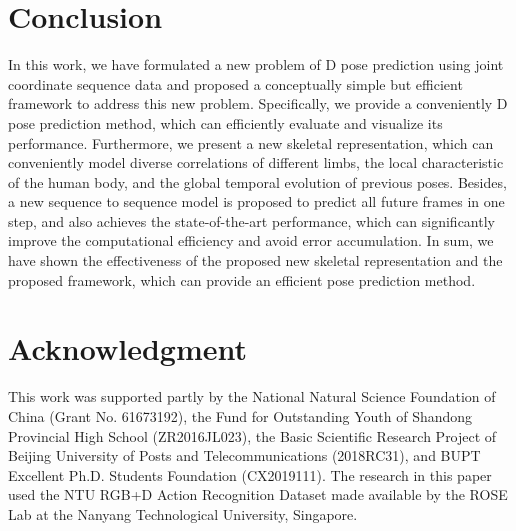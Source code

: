 \documentclass[journal]{IEEEtran}
\begin{document}
\section{Conclusion}
In this work, we have formulated a new problem of D pose prediction using joint coordinate sequence data and proposed a conceptually simple but efficient framework to address this new problem. Specifically, we provide a conveniently D pose prediction method, which can efficiently evaluate and visualize its performance. Furthermore, we present a new skeletal representation, which can conveniently model diverse correlations of different limbs, the local characteristic of the human body, and the global temporal evolution of previous poses. Besides, a new sequence to sequence model is proposed to predict all future frames in one step, and also achieves the state-of-the-art performance, which can significantly improve the computational efficiency and avoid error accumulation. In sum, we have shown the effectiveness of the proposed new skeletal representation and the proposed framework, which can provide an efficient pose prediction method.


\section*{Acknowledgment}

This work was supported partly by the National Natural Science Foundation of China (Grant No. 61673192), the Fund for Outstanding Youth of Shandong Provincial High School (ZR2016JL023), the Basic Scientific Research Project of Beijing University of Posts and Telecommunications (2018RC31), and BUPT Excellent Ph.D. Students Foundation (CX2019111). The research in this paper used the NTU RGB+D Action Recognition Dataset made available by the ROSE Lab at the Nanyang Technological University, Singapore.


\ifCLASSOPTIONcaptionsoff
  \newpage
\fi









\end{document}
